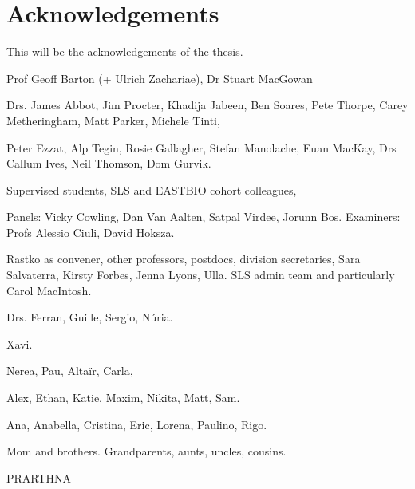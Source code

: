\chapter*{Acknowledgements} %
This will be the acknowledgements of the thesis.

Prof Geoff Barton (+ Ulrich Zachariae), Dr Stuart MacGowan

Drs. James Abbot, Jim Procter, Khadija Jabeen, Ben Soares, Pete Thorpe, Carey Metheringham, Matt Parker, Michele Tinti, 

Peter Ezzat, Alp Tegin, Rosie Gallagher, Stefan Manolache, Euan MacKay, Drs Callum Ives, Neil Thomson, Dom Gurvik.

Supervised students, SLS and EASTBIO cohort colleagues,

Panels: Vicky Cowling, Dan Van Aalten, Satpal Virdee, Jorunn Bos. Examiners: Profs Alessio Ciuli, David Hoksza.

Rastko as convener, other professors, postdocs, division secretaries, Sara Salvaterra, Kirsty Forbes, Jenna Lyons, Ulla. SLS admin team and particularly Carol MacIntosh.

Drs. Ferran, Guille, Sergio, Núria.

Xavi.

Nerea, Pau, Altaïr, Carla, 

Alex, Ethan, Katie, Maxim, Nikita, Matt, Sam.

Ana, Anabella, Cristina, Eric, Lorena, Paulino, Rigo.

Mom and brothers. Grandparents, aunts, uncles, cousins.

PRARTHNA
